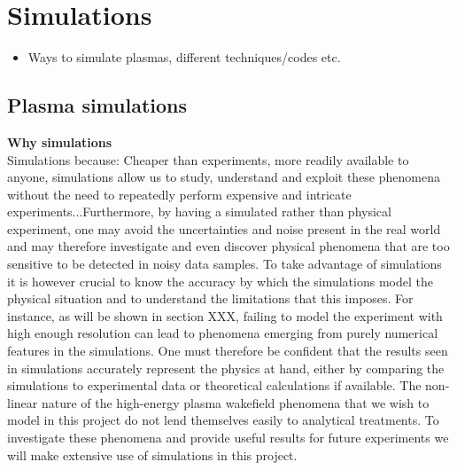 \chapter{Simulations}
\begin{itemize}
\item Ways to simulate plasmas, different techniques/codes etc.
\end{itemize}
\section{Plasma simulations}
\textbf{Why simulations}\\
Simulations because: Cheaper than experiments, more readily available to anyone, simulations allow us to study, understand and exploit these phenomena without the need to repeatedly perform expensive and intricate experiments...Furthermore, by having a simulated rather than physical experiment, one may avoid the uncertainties and noise present in the real world and may therefore investigate and even discover physical phenomena that are too sensitive to be detected in noisy data samples. To take advantage of simulations it is however crucial to know the accuracy by which the simulations model the physical situation and to understand the limitations that this imposes. For instance, as will be shown in section XXX, failing to model the experiment with high enough resolution can lead to phenomena emerging from purely numerical features in the simulations. One must therefore be confident that the results seen in simulations accurately represent the physics at hand, either by comparing the simulations to experimental data or theoretical calculations if available. The non-linear nature of the high-energy plasma wakefield phenomena that we wish to model in this project do not lend themselves easily to analytical treatments. To investigate these phenomena and provide useful results for future experiments we will make extensive use of simulations in this project.\\ 
